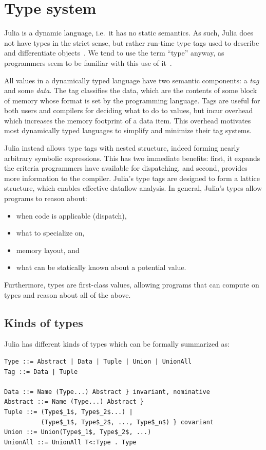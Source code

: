 \documentclass[pldi]{sigplanconf-pldi15}
\begin{document}
\section{Type system}

Julia is a dynamic language, i.e.\ it has no static semantics. As such, Julia
does not have types in the strict sense, but rather run-time type tags used to
describe and differentiate objects~\cite[Section 11.10, p. 142]{Pierce2002}.
We tend to use the term ``type'' anyway, as programmers seem to be familiar
with this use of it~\cite{Tratt2009,Kell2014}.

All values in a dynamically typed language have two semantic components:
a \emph{tag} and some \emph{data}. The tag classifies the data, which are the
contents of some block of memory whose format is set by the programming
language. Tags are useful for both users and compilers for deciding what to do
to values, but incur overhead which increases the memory footprint of a data
item. This overhead motivates most dynamically typed languages to simplify and
minimize their tag systems.

Julia instead allows type tags with nested structure, indeed forming nearly
arbitrary symbolic expressions. This has two immediate benefits: first,
it expands the criteria programmers have available for dispatching, and second,
provides more information to the compiler. Julia's type tags are designed
to form a lattice structure, which enables effective dataflow analysis.
In general, Julia's types allow programs to reason about:

\begin{itemize}
\item when code is applicable (dispatch),
\item what to specialize on,
\item memory layout, and
\item what can be statically known about a potential value.
\end{itemize}
%
Furthermore, types are first-class values, allowing programs that can compute
on types and reason about all of the above.


\subsection{Kinds of types}

Julia has different kinds of types which can be formally summarized as:

\begin{lstlisting}
Type ::= Abstract | Data | Tuple | Union | UnionAll
Tag ::= Data | Tuple

Data ::= Name (Type...) Abstract } invariant, nominative
Abstract ::= Name (Type...) Abstract }
Tuple ::= (Type$_1$, Type$_2$...) |
          (Type$_1$, Type$_2$, ..., Type$_n$) } covariant
Union ::= Union(Type$_1$, Type$_2$, ...)
UnionAll ::= UnionAll T<:Type . Type
\end{lstlisting}
\end{document}
